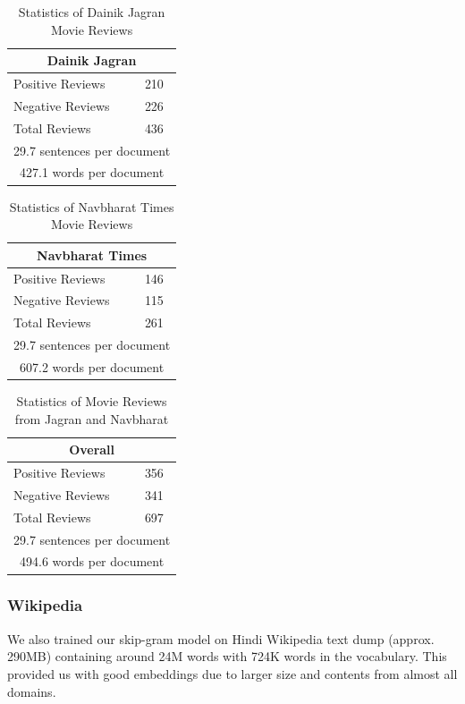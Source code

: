 \documentclass[11pt,a4paper]{article}
\begin{document}
\begin {table}[h!]
\large
\centering
\begin{tabular}{ |l|l| }
\hline
\multicolumn{2}{|c|}{\textbf{Dainik Jagran}} \\
\hline
Positive Reviews & 210 \\ 
Negative Reviews & 226 \\
Total Reviews & 436\\ \hline
\multicolumn{2}{|c|}{29.7 sentences per document} \\ \hline
\multicolumn{2}{|c|}{427.1 words per document} \\
\hline
\end{tabular}
\caption {Statistics of Dainik Jagran Movie Reviews}
\end{table}

\begin {table}[h!]
\large
\centering
\begin{tabular}{ |l|l| }
\hline
\multicolumn{2}{|c|}{\textbf{Navbharat Times}} \\
\hline
Positive Reviews & 146 \\ 
Negative Reviews & 115 \\
Total Reviews & 261\\ \hline
\multicolumn{2}{|c|}{29.7 sentences per document} \\ \hline
\multicolumn{2}{|c|}{607.2 words per document} \\
\hline
\end{tabular}
\caption {Statistics of Navbharat Times Movie Reviews}
\end{table}

\begin {table}[h!]
\large
\centering
\begin{tabular}{ |l|l| }
\hline
\multicolumn{2}{|c|}{\textbf{Overall}} \\
\hline
Positive Reviews & 356 \\ 
Negative Reviews & 341 \\
Total Reviews & 697\\ \hline
\multicolumn{2}{|c|}{29.7 sentences per document} \\ \hline
\multicolumn{2}{|c|}{494.6 words per document} \\
\hline
\end{tabular}
\caption {Statistics of Movie Reviews from Jagran and Navbharat}
\end{table}
\subsubsection{Wikipedia}
We also trained our skip-gram model on Hindi Wikipedia text dump (approx. 290MB) containing around 24M words with 724K words in the vocabulary. This provided us with good embeddings due to larger size and contents from almost all domains.
\end{document}
